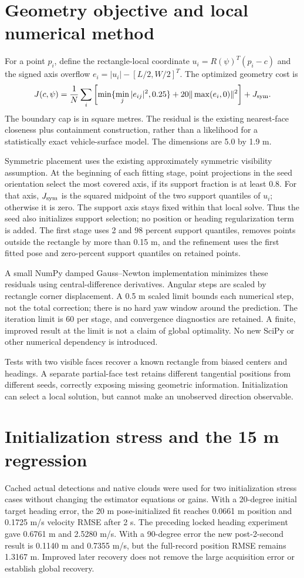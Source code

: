 \documentclass[11pt]{article}
\begin{document}
\section{Geometry objective and local numerical method}
For a point $p_i$, define the rectangle-local coordinate
$u_i=R(\psi)^T(p_i-c)$ and the signed axis overflow
$e_i=|u_i|-[L/2,W/2]^T$. The optimized geometry cost is
\[
 J(c,\psi)=\frac1N\sum_i\left[
 \min\{\min_j |e_{ij}|^2,0.25\}
 +20\|\max(e_i,0)\|^2\right]+J_{\rm sym}.
\]
The boundary cap is in square metres. The residual is the existing nearest-face
closeness plus containment construction, rather than a likelihood for a
statistically exact vehicle-surface model. The dimensions are 5.0 by 1.9 m.

Symmetric placement uses the existing approximately symmetric visibility
assumption. At the beginning of each fitting stage, point projections in the
seed orientation select the most covered axis, if its support fraction is at
least 0.8. For that axis, $J_{\rm sym}$ is the squared midpoint of the two
support quantiles of $u_i$; otherwise it is zero. The support axis stays fixed
within that local solve. Thus the seed also initializes support selection; no
position or heading regularization term is added. The first stage uses 2 and
98 percent support quantiles, removes points outside the rectangle by more
than 0.15 m, and the refinement uses the first fitted pose and zero-percent
support quantiles on retained points.

A small NumPy damped Gauss--Newton implementation minimizes these residuals
using central-difference derivatives. Angular steps are scaled by rectangle
corner displacement. A 0.5 m scaled limit bounds each numerical step, not the
total correction; there is no hard yaw window around the prediction.
The iteration limit is 60 per stage, and convergence diagnostics are retained.
A finite, improved result at the limit is not a claim of global optimality.
No new SciPy or other numerical dependency is introduced.

Tests with two visible faces recover a known rectangle from biased centers and
headings. A separate partial-face test retains different tangential positions
from different seeds, correctly exposing missing geometric information.
Initialization can select a local solution, but cannot make an unobserved
direction observable.

\section{Initialization stress and the 15 m regression}
Cached actual detections and native clouds were used for two initialization
stress cases without changing the estimator equations or gains. With a
20-degree initial target heading error, the 20 m pose-initialized fit reaches
0.0661 m position and 0.1725 m/s velocity RMSE after 2 s. The preceding locked
heading experiment gave 0.6761 m and 2.5280 m/s. With a 90-degree error the new
post-2-second result is 0.1140 m and 0.7355 m/s, but the full-record position
RMSE remains 1.3167 m. Improved later recovery does not remove the large
acquisition error or establish global recovery.
\end{document}
